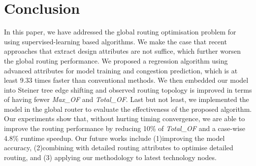 \section{Conclusion}
\label{sec:conlu}

In this paper, we have addressed the global routing optimisation problem for using supervised-learning based algorithms. We make the case that recent approaches that extract design attributes are not suffice, which further worsen the global routing performance. We proposed a regression algorithm using advanced attributes for model training and congestion prediction, which is at least 9.33 times faster than conventional methods. We then embedded our model into Steiner tree edge shifting and observed routing topology is improved in terms of having fewer \textit{Max\_OF} and \textit{Total\_OF}. Last but not least, we implemented the model in the global router to evaluate the effectiveness of the proposed algorithm. Our experiments show that, without hurting timing convergence, we are able to improve the routing performance by reducing 10\% of \textit{Total\_OF} and a case-wise 4.8\% runtime speedup. Our future works include (1)improving the model accuracy, (2)combining with detailed routing attributes to optimise detailed routing, and (3) applying our methodology to latest technology nodes.
